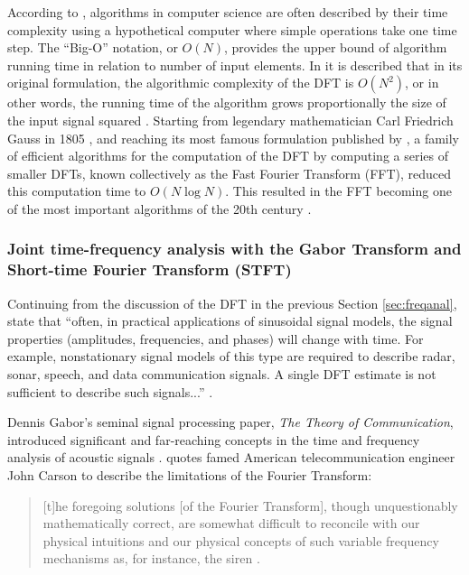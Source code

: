\documentclass[report.tex]{subfiles}
\begin{document}
According to \textcite{skiena}, algorithms in computer science are often described by their time complexity using a hypothetical computer where simple operations take one time step. The ``Big-O'' notation, or $O(N)$, provides the upper bound of algorithm running time in relation to number of input elements. In \textcite[Chapter~9]{discretebook} it is described that in its original formulation, the algorithmic complexity of the DFT is $O(N^{2})$, or in other words, the running time of the algorithm grows proportionally the size of the input signal squared \parencite{skiena}.  Starting from legendary mathematician Carl Friedrich Gauss in 1805 \parencite{gausshist}, and reaching its most famous formulation published by \textcite{cooleytukey}, a family of efficient algorithms for the computation of the DFT by computing a series of smaller DFTs, known collectively as the Fast Fourier Transform (FFT), reduced this computation time to $O(N \log{N})$. This resulted in the FFT becoming one of the most important algorithms of the 20th century \parencite{ffttopten}.

\newpagefill

\subsubsection{Joint time-frequency analysis with the Gabor Transform and Short-time Fourier Transform (STFT)}
\label{sec:jointtfa}

Continuing from the discussion of the DFT in the previous Section \ref{sec:freqanal}, \citeauthor{discretebook} state that ``often, in practical applications of sinusoidal signal models, the signal properties (amplitudes, frequencies, and phases) will change with time. For example, nonstationary signal models of this type are required to describe radar, sonar, speech, and data communication signals. A single DFT estimate is not sufficient to describe such signals...'' \parencite[714]{discretebook}.

Dennis Gabor's seminal signal processing paper, \textit{The Theory of Communication}, introduced significant and far-reaching concepts in the time and frequency analysis of acoustic signals \parencite{gabor1946}. \citeauthor{gabor1946} quotes famed American telecommunication engineer John Carson \parencite{carsonfamous} to describe the limitations of the Fourier Transform:

\begin{quote}
	[t]he foregoing solutions [of the Fourier Transform], though unquestionably mathematically correct, are somewhat difficult to reconcile with our physical intuitions and our physical concepts of such variable frequency mechanisms as, for instance, the siren \parencite[431]{gabor1946}.
\end{quote}
\end{document}
